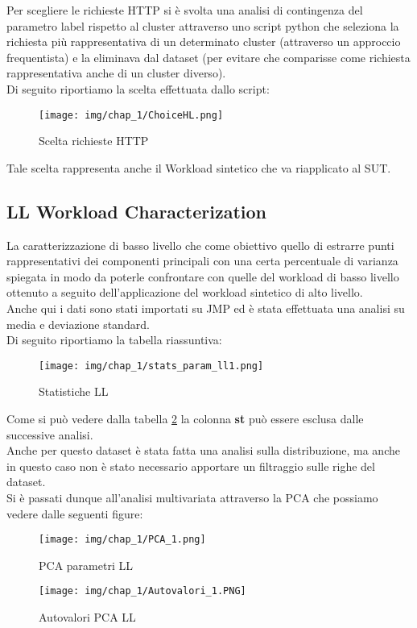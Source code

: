 \noindent
Per scegliere le richieste HTTP si è svolta una analisi di contingenza del parametro label rispetto al cluster attraverso uno script python che seleziona la richiesta più rappresentativa di un determinato cluster (attraverso un approccio frequentista) e la eliminava dal dataset (per evitare che comparisse come richiesta rappresentativa anche di un cluster diverso).\\
Di seguito riportiamo la scelta effettuata dallo script:
\begin{figure}[H]
    \centering
    \texttt{[image: img/chap\_1/ChoiceHL.png]}
    \caption{Scelta richieste HTTP}
    \label{fig:ch_http_req}
\end{figure}
\noindent
Tale scelta rappresenta anche il Workload sintetico che va riapplicato al SUT.
\subsection{LL Workload Characterization}
La caratterizzazione di basso livello che come obiettivo quello di estrarre punti rappresentativi dei componenti principali con una certa percentuale di varianza spiegata in modo da poterle confrontare con quelle del workload di basso livello ottenuto a seguito dell'applicazione del workload sintetico di alto livello.\\
Anche qui i dati sono stati importati su JMP ed è stata effettuata una analisi su media e deviazione standard.\\
Di seguito riportiamo la tabella riassuntiva:
\begin{figure}[H]
    \centering
    \texttt{[image: img/chap\_1/stats\_param\_ll1.png]}
    \caption{Statistiche LL}
    \label{fig:ll_stats}
\end{figure}
\noindent
Come si può vedere dalla tabella \ref{fig:ll_stats} la colonna \textbf{st} può essere esclusa dalle successive analisi.\\
Anche per questo dataset è stata fatta una analisi sulla distribuzione, ma anche in questo caso non è stato necessario apportare un filtraggio sulle righe del dataset.\\
Si è passati dunque all'analisi multivariata attraverso la PCA che possiamo vedere dalle seguenti figure:
\begin{figure}[H]
    \centering
    \texttt{[image: img/chap\_1/PCA\_1.png]}
    \caption{PCA parametri LL}
    \label{fig:pca_ll}
\end{figure}
\noindent
\begin{figure}[H]
    \centering
    \texttt{[image: img/chap\_1/Autovalori\_1.PNG]}
    \caption{Autovalori PCA LL}
    \label{fig:autoval_ll}
\end{figure}
